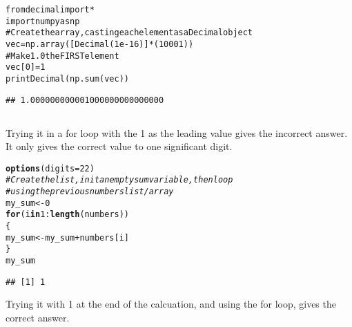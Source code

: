 \documentclass{article}\usepackage[]{graphicx}\usepackage[]{color}
\makeatletter
\newcommand{\hlnum}[1]{\textcolor[rgb]{0.686,0.059,0.569}{#1}}%
\newcommand{\hlcom}[1]{\textcolor[rgb]{0.678,0.584,0.686}{\textit{#1}}}%
\newcommand{\hlopt}[1]{\textcolor[rgb]{0,0,0}{#1}}%
\newcommand{\hlstd}[1]{\textcolor[rgb]{0.345,0.345,0.345}{#1}}%
\newcommand{\hlkwa}[1]{\textcolor[rgb]{0.161,0.373,0.58}{\textbf{#1}}}%
\newcommand{\hlkwb}[1]{\textcolor[rgb]{0.69,0.353,0.396}{#1}}%
\newcommand{\hlkwc}[1]{\textcolor[rgb]{0.333,0.667,0.333}{#1}}%
\newcommand{\hlkwd}[1]{\textcolor[rgb]{0.737,0.353,0.396}{\textbf{#1}}}%
\newenvironment{kframe}{%
 \def\at@end@of@kframe{}%
 \ifinner\ifhmode%
  \def\at@end@of@kframe{\end{minipage}}%
  \begin{minipage}{\columnwidth}%
 \fi\fi%
 \def\FrameCommand##1{\hskip\@totalleftmargin \hskip-\fboxsep
 \colorbox{shadecolor}{##1}\hskip-\fboxsep
     \hskip-\linewidth \hskip-\@totalleftmargin \hskip\columnwidth}%
 \MakeFramed {\advance\hsize-\width
   \@totalleftmargin\z@ \linewidth\hsize
   \@setminipage}}%
 {\par\unskip\endMakeFramed%
 \at@end@of@kframe}
\newenvironment{knitrout}{}{} %
\makeatother
\begin{document}
\begin{knitrout}
\color{fgcolor}\begin{kframe}
\begin{alltt}
from decimal import *
import numpy as np
# Create the array, casting each element as a Decimal object
vec = np.array([Decimal(1e-16)]*(10001))
# Make 1.0 the FIRST element
vec[0] = 1
print Decimal(np.sum(vec))
\end{alltt}

\begin{verbatim}
## 1.000000000001000000000000000
\end{verbatim}
\end{kframe}
\end{knitrout}

\subsection{}

Trying it in a for loop with the 1 as the leading value gives the incorrect answer.  It only gives the correct value to one significant digit.

\begin{knitrout}
\color{fgcolor}\begin{kframe}
\begin{alltt}
\hlkwd{options}\hlstd{(}\hlkwc{digits}\hlstd{=}\hlnum{22}\hlstd{)}
\hlcom{# Create the list, init an empty sum variable, then loop}
\hlcom{# using the previous numbers list/array}
\hlstd{my_sum} \hlkwb{<-} \hlnum{0}
\hlkwa{for} \hlstd{(i} \hlkwa{in} \hlnum{1}\hlopt{:}\hlkwd{length}\hlstd{(numbers))}
\hlstd{\{}
    \hlstd{my_sum} \hlkwb{<-} \hlstd{my_sum} \hlopt{+} \hlstd{numbers[i]}
\hlstd{\}}
\hlstd{my_sum}
\end{alltt}
\begin{verbatim}
## [1] 1
\end{verbatim}
\end{kframe}
\end{knitrout}

Trying it with 1 at the end of the calcuation, and using the for loop, gives the correct answer.
\end{document}
